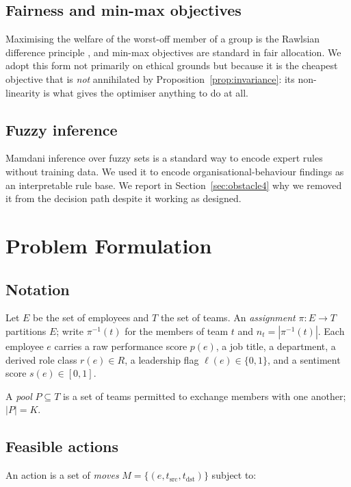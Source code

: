 \documentclass[conference]{IEEEtran}
\begin{document}
\subsection{Fairness and min-max objectives}
Maximising the welfare of the worst-off member of a group is the Rawlsian
difference principle \cite{rawls1971}, and min-max objectives are standard in
fair allocation. We adopt this form not primarily on ethical grounds but because
it is the cheapest objective that is \emph{not} annihilated by
Proposition~\ref{prop:invariance}: its non-linearity is what gives the optimiser
anything to do at all.

\subsection{Fuzzy inference}
Mamdani inference \cite{mamdani1975} over fuzzy sets \cite{zadeh1965} is a
standard way to encode expert rules without training data. We used it to encode
organisational-behaviour findings
\cite{crosby1976,kristof2005,karau1993,byrne1971,kanter1977,graen1995}
as an interpretable rule base. We report in
Section~\ref{sec:obstacle4} why we removed it from the decision path despite it
working as designed.

\section{Problem Formulation}\label{sec:formulation}

\subsection{Notation}
Let $E$ be the set of employees and $T$ the set of teams. An \emph{assignment}
$\pi : E \to T$ partitions $E$; write $\pi^{-1}(t)$ for the members of team $t$
and $n_t = |\pi^{-1}(t)|$. Each employee $e$ carries a raw performance score
$p(e)$, a job title, a department, a derived role class $r(e) \in R$, a
leadership flag $\ell(e)\in\{0,1\}$, and a sentiment score $s(e)\in[0,1]$.

A \emph{pool} $P \subseteq T$ is a set of teams permitted to exchange members
with one another; $|P| = K$.

\subsection{Feasible actions}
An action is a set of \emph{moves} $M = \{(e, t_{\text{src}}, t_{\text{dst}})\}$
subject to:
\end{document}
